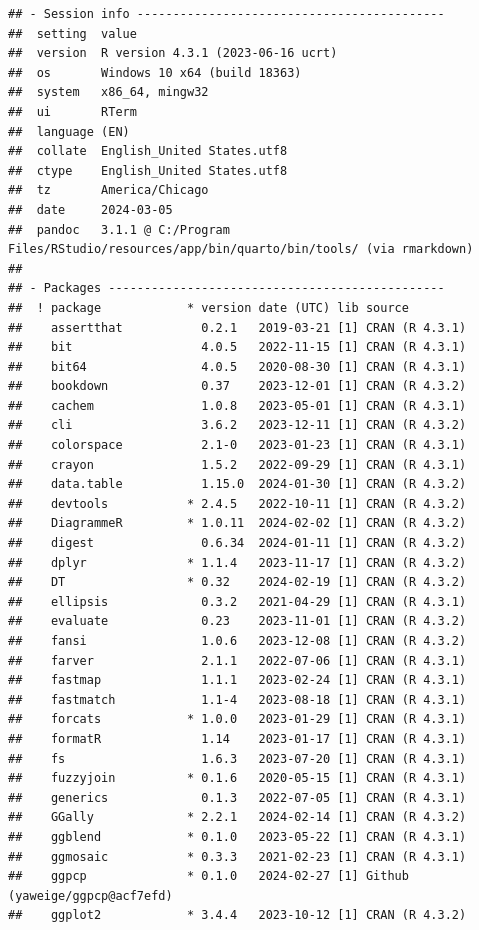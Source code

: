 \documentclass[print]{nuthesis}
\begin{document}
\begin{verbatim}
## - Session info -------------------------------------------
##  setting  value
##  version  R version 4.3.1 (2023-06-16 ucrt)
##  os       Windows 10 x64 (build 18363)
##  system   x86_64, mingw32
##  ui       RTerm
##  language (EN)
##  collate  English_United States.utf8
##  ctype    English_United States.utf8
##  tz       America/Chicago
##  date     2024-03-05
##  pandoc   3.1.1 @ C:/Program Files/RStudio/resources/app/bin/quarto/bin/tools/ (via rmarkdown)
## 
## - Packages -----------------------------------------------
##  ! package            * version date (UTC) lib source
##    assertthat           0.2.1   2019-03-21 [1] CRAN (R 4.3.1)
##    bit                  4.0.5   2022-11-15 [1] CRAN (R 4.3.1)
##    bit64                4.0.5   2020-08-30 [1] CRAN (R 4.3.1)
##    bookdown             0.37    2023-12-01 [1] CRAN (R 4.3.2)
##    cachem               1.0.8   2023-05-01 [1] CRAN (R 4.3.1)
##    cli                  3.6.2   2023-12-11 [1] CRAN (R 4.3.2)
##    colorspace           2.1-0   2023-01-23 [1] CRAN (R 4.3.1)
##    crayon               1.5.2   2022-09-29 [1] CRAN (R 4.3.1)
##    data.table           1.15.0  2024-01-30 [1] CRAN (R 4.3.2)
##    devtools           * 2.4.5   2022-10-11 [1] CRAN (R 4.3.2)
##    DiagrammeR         * 1.0.11  2024-02-02 [1] CRAN (R 4.3.2)
##    digest               0.6.34  2024-01-11 [1] CRAN (R 4.3.2)
##    dplyr              * 1.1.4   2023-11-17 [1] CRAN (R 4.3.2)
##    DT                 * 0.32    2024-02-19 [1] CRAN (R 4.3.2)
##    ellipsis             0.3.2   2021-04-29 [1] CRAN (R 4.3.1)
##    evaluate             0.23    2023-11-01 [1] CRAN (R 4.3.2)
##    fansi                1.0.6   2023-12-08 [1] CRAN (R 4.3.2)
##    farver               2.1.1   2022-07-06 [1] CRAN (R 4.3.1)
##    fastmap              1.1.1   2023-02-24 [1] CRAN (R 4.3.1)
##    fastmatch            1.1-4   2023-08-18 [1] CRAN (R 4.3.1)
##    forcats            * 1.0.0   2023-01-29 [1] CRAN (R 4.3.1)
##    formatR              1.14    2023-01-17 [1] CRAN (R 4.3.1)
##    fs                   1.6.3   2023-07-20 [1] CRAN (R 4.3.1)
##    fuzzyjoin          * 0.1.6   2020-05-15 [1] CRAN (R 4.3.1)
##    generics             0.1.3   2022-07-05 [1] CRAN (R 4.3.1)
##    GGally             * 2.2.1   2024-02-14 [1] CRAN (R 4.3.2)
##    ggblend            * 0.1.0   2023-05-22 [1] CRAN (R 4.3.1)
##    ggmosaic           * 0.3.3   2021-02-23 [1] CRAN (R 4.3.1)
##    ggpcp              * 0.1.0   2024-02-27 [1] Github (yaweige/ggpcp@acf7efd)
##    ggplot2            * 3.4.4   2023-10-12 [1] CRAN (R 4.3.2)

\end{verbatim}
\end{document}
